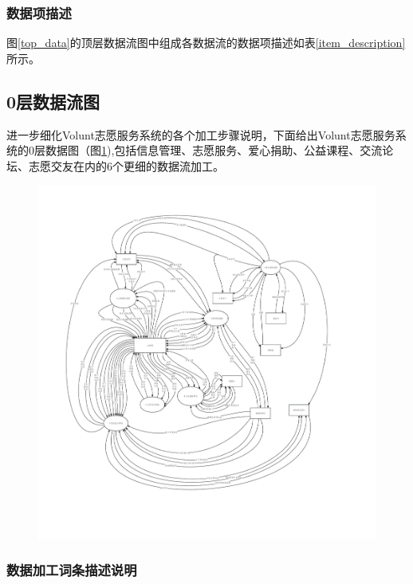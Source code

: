 

\subsubsection{数据项描述}

图\ref{top_data}的顶层数据流图中组成各数据流的数据项描述如表\ref{item_description}所示。



\subsection{0层数据流图} 
进一步细化Volunt志愿服务系统的各个加工步骤说明，下面给出Volunt志愿服务系统的0层数据图（图\ref{0_level_data}),包括信息管理、志愿服务、爱心捐助、公益课程、交流论坛、志愿交友在内的6个更细的数据流加工。

\begin{figure}[H]
  \centering
  \includegraphics[width=\textwidth, height=0.95\textheight]{SAD/fig/0_level.pdf}
  \label{0_level_data}
\end{figure}
  
\subsubsection{数据加工词条描述说明}


